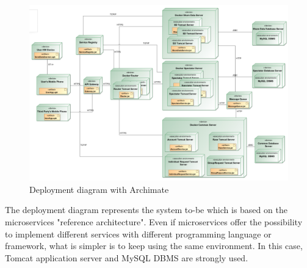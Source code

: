 \begin{figure}[H]
\includegraphics[width=\linewidth]{Images/deploymentdiagram.pdf}
\caption{ Deployment diagram with Archimate }
\label{fig:deployment}
\end{figure}

The deployment diagram represents the system to-be which is based on the microservices "reference architecture". Even if 
microservices offer the possibility to implement different services with different programming language or framework, what is simpler 
is to keep using the same environment. In this case, Tomcat application server and MySQL DBMS are strongly used. 